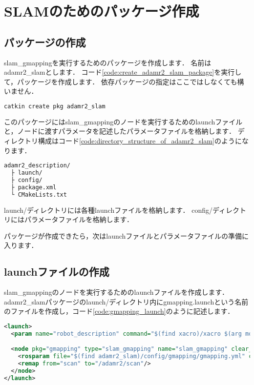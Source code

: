 \documentclass[{../../master}]{subfiles}
\begin{document}
\section{SLAMのためのパッケージ作成}

\subsection{パッケージの作成}

\textsf{slam\_gmapping}を実行するためのパッケージを作成します．
名前は\textsf{adamr2\_slam}とします．
コード\ref{code:create_adamr2_slam_package}を実行して，パッケージを作成します．
依存パッケージの指定はここではしなくても構いません．

\begin{lstlisting}[language=sh, label=code:create_adamr2_slam_package, caption=Create \textsf{adamr2\_slam} Package]
catkin create pkg adamr2_slam
\end{lstlisting}

このパッケージには\textsf{slam\_gmapping}のノードを実行するためのlaunchファイルと，ノードに渡すパラメータを記述したパラメータファイルを格納します．
ディレクトリ構成はコード\ref{code:directory_structure_of_adamr2_slam}のようになります．

\begin{lstlisting}[language=sh, caption=Directory Structure of adamr2\_slam, label=code;directory_structure_of_adamr2_slam]
adamr2_description/
  ├ launch/
  ├ config/
  ├ package.xml
  └ CMakeLists.txt
\end{lstlisting}

\textsf{launch/}ディレクトリには各種launchファイルを格納します．
\textsf{config/}ディレクトリにはパラメータファイルを格納します．

パッケージが作成できたら，次はlaunchファイルとパラメータファイルの準備に入ります．

\subsection{launchファイルの作成}

\textsf{slam\_gmapping}のノードを実行するためのlaunchファイルを作成します．
\textsf{adamr2\_slam}パッケージの\textsf{launch/}ディレクトリ内に\textsf{gmapping.launch}という名前のファイルを作成し，コード\ref{code:gmapping_launch}のように記述します．

\begin{lstlisting}[language=XML, label=code:gmapping_launch, caption=\textsf{gmapping.launch}]
<launch>
  <param name="robot_description" command="$(find xacro)/xacro $(arg model)"/>

  <node pkg="gmapping" type="slam_gmapping" name="slam_gmapping" clear_params="true">
    <rosparam file="$(find adamr2_slam)/config/gmapping/gmapping.yml" command="load"/>
    <remap from="scan" to="/adamr2/scan"/>
  </node>
</launch>
\end{lstlisting}
\end{document}

